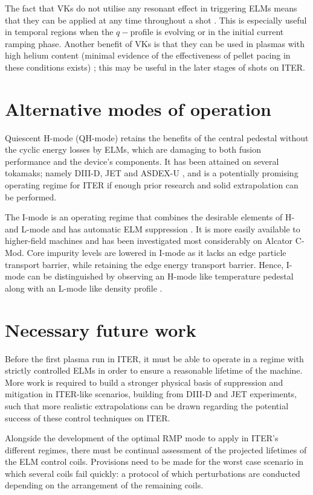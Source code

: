 \documentclass[11pt, twocolumn]{article}  %
\newcommand{\citep}[1]{\cite{#1}}
\begin{document}
The fact that VKs do not utilise any resonant effect in triggering ELMs means that they can be applied at any time throughout a shot \cite{Chapman2016}. This is especially useful in temporal regions when the $q-$profile is evolving or in the initial current ramping phase. Another benefit of VKs is that they can be used in plasmas with high helium content (minimal evidence of the effectiveness of pellet pacing in these conditions exists) \citep{Chapman2016}; this may be useful in the later stages of shots on ITER. 

\section{Alternative modes of operation}\label{sec:altmodes}
Quiescent H-mode (QH-mode) retains the benefits of the central pedestal without the cyclic energy losses by ELMs, which are damaging to both fusion performance and the device's components. It has been attained on several tokamaks; namely DIII-D, JET and ASDEX-U \cite{Burrell2002, Suttrop2005}, and is a potentially promising operating regime for ITER if enough prior research and solid extrapolation can be performed.

The I-mode is an operating regime that combines the desirable elements of H- and L-mode \cite{Whyte2010} and has automatic ELM suppression \cite{Marmar2015}. It is more easily available to higher-field machines and has been investigated most considerably on Alcator C-Mod. Core impurity levels are lowered in I-mode as it lacks an edge particle transport barrier, while retaining the edge energy transport barrier. Hence, I-mode can be distinguished by observing an H-mode like temperature pedestal along with an L-mode like density profile \cite{Whyte2010}.

\section{Necessary future work}\label{sec:Future}
Before the first plasma run in ITER, it must be able to operate in a regime with strictly controlled ELMs in order to ensure a reasonable lifetime of the machine. More work is required to build a stronger physical basis of suppression and mitigation in ITER-like scenarios, building from DIII-D \cite{Evans2008,Lanctot2013} and JET \cite{Liang2013} experiments, such that more realistic extrapolations can be drawn regarding the potential success of these control techniques on ITER.

Alongside the development of the optimal RMP mode to apply in ITER's different regimes, there must be continual assessment of the projected lifetimes of the ELM control coils. Provisions need to be made for the worst case scenario in which several coils fail quickly: a protocol of which perturbations are conducted depending on the arrangement of the remaining coils. 
\end{document}
